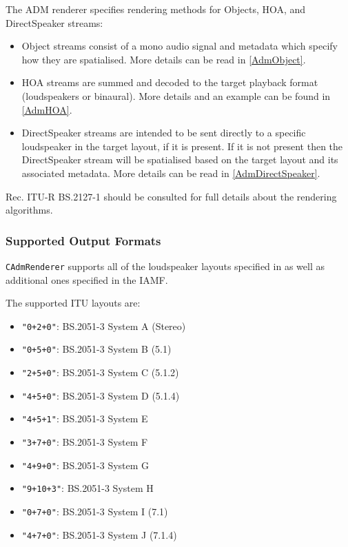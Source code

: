 \documentclass[12pt]{report}
\newcommand{\code}[1]{\texttt{#1}}
\begin{document}
The ADM renderer specifies rendering methods for Objects, HOA, and DirectSpeaker streams:
\begin{itemize}
    \item Object streams consist of a mono audio signal and metadata which specify how they are spatialised. More details can be read in \cref{AdmObject}.
    \item HOA streams are summed and decoded to the target playback format (loudspeakers or binaural). More details and an example can be found in \cref{AdmHOA}.
    \item DirectSpeaker streams are intended to be sent directly to a specific loudspeaker in the target layout, if it is present.
If it is not present then the DirectSpeaker stream will be spatialised based on the target layout and its associated metadata. More details can be read in \cref{AdmDirectSpeaker}.
\end{itemize}

Rec. ITU-R BS.2127-1 \cite{ITU2127} should be consulted for full details about the rendering algorithms.

\subsubsection{Supported Output Formats}

\code{CAdmRenderer} supports all of the loudspeaker layouts specified in \cite{ITU2127} as well as additional ones specified in the IAMF. 

The supported ITU layouts are:
\begin{itemize}
    \item \code{"0+2+0"}: BS.2051-3 System A (Stereo)
    \item \code{"0+5+0"}: BS.2051-3 System B (5.1)
    \item \code{"2+5+0"}: BS.2051-3 System C (5.1.2)
    \item \code{"4+5+0"}: BS.2051-3 System D (5.1.4)
    \item \code{"4+5+1"}: BS.2051-3 System E
    \item \code{"3+7+0"}: BS.2051-3 System F
    \item \code{"4+9+0"}: BS.2051-3 System G
    \item \code{"9+10+3"}: BS.2051-3 System H
    \item \code{"0+7+0"}: BS.2051-3 System I (7.1)
    \item \code{"4+7+0"}: BS.2051-3 System J (7.1.4)
\end{itemize}
\end{document}
